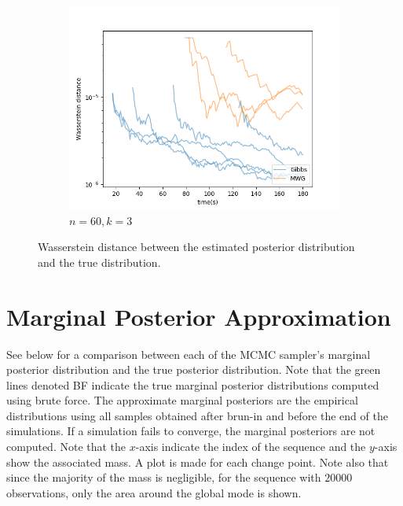 \begin{figure}[H]
\begin{subfigure}{0.3\linewidth}
    	\includegraphics[width=\linewidth]{../../plots/KL_M4_N60_NMCMC3_seed0_diffind2.png}
    	\caption{$n=60, k=3$}
	\end{subfigure}
	\caption{Wasserstein distance between the estimated posterior distribution and the true distribution.}
\end{figure}

\section{Marginal Posterior Approximation}\label{appendix:marginal_post}

See below for a comparison between each of the MCMC sampler's marginal posterior distribution and the true posterior distribution. Note that the green lines denoted BF indicate the true marginal posterior distributions computed using brute force. The approximate marginal posteriors are the empirical distributions using all samples obtained after brun-in and before the end of the simulations. If a simulation fails to converge, the marginal posteriors are not computed. Note that the $x$-axis indicate the index of the sequence and the $y$-axis show the associated mass. A plot is made for each change point. Note also that since the majority of the mass is negligible, for the sequence with $20000$ observations, only the area around the global mode is shown.

